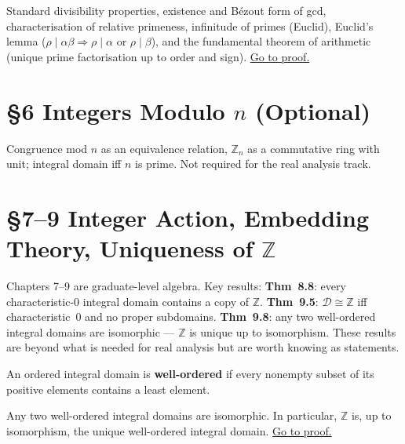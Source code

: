 \begin{theorem}[Mendelson 5.2--5.9]
\label{thm:men-divisibility-properties}
Standard divisibility properties, existence and B\'{e}zout form of gcd,
characterisation of relative primeness, infinitude of primes
(Euclid), Euclid's lemma ($\rho\mid\alpha\beta\Rightarrow\rho\mid\alpha$
or $\rho\mid\beta$), and the fundamental theorem of arithmetic
(unique prime factorisation up to order and sign).
\hyperref[prf:men-divisibility-properties]{Go to proof.}
\end{theorem}

\section*{\texorpdfstring{\S{}6 \quad Integers Modulo $n$ (Optional)}{S6 quad Integers Modulo n (Optional)}}

\begin{remark*}[Scope]
Congruence mod $n$ as an equivalence relation, $\mathbb{Z}_n$ as a
commutative ring with unit; integral domain iff $n$ is prime.
Not required for the real analysis track.
\end{remark*}

\section*{\texorpdfstring{\S{}7--9 \quad Integer Action, Embedding Theory, Uniqueness of $\mathbb{Z}$}{S7--9 quad Integer Action, Embedding Theory, Uniqueness of Z}}

\begin{remark*}[Scope]
Chapters 7--9 are graduate-level algebra.
Key results:
\textbf{Thm~8.8}: every characteristic-$0$ integral domain contains
a copy of $\mathbb{Z}$.
\textbf{Thm~9.5}: $\mathcal{D}\cong\mathbb{Z}$ iff characteristic~$0$
and no proper subdomains.
\textbf{Thm~9.8}: any two well-ordered integral domains are isomorphic
--- $\mathbb{Z}$ is unique up to isomorphism.
These results are beyond what is needed for real analysis but are
worth knowing as statements.
\end{remark*}

\begin{definition}
\label{def:men-well-ordered-integral-domain}
An ordered integral domain is \textbf{well-ordered} if every nonempty
subset of its positive elements contains a least element.
\end{definition}

\begin{theorem}
\label{thm:men-well-ordered-integral-domain-uniqueness}
Any two well-ordered integral domains are isomorphic.
In particular, $\mathbb{Z}$ is, up to isomorphism, the unique
well-ordered integral domain.
\hyperref[prf:men-well-ordered-integral-domain-uniqueness]{Go to proof.}
\end{theorem}
